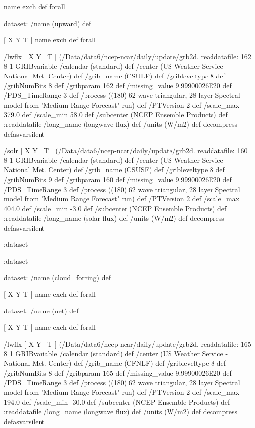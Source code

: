 \begin{ingrid}
   [ X Y T ] { name exch def } forall

   dataset: /name (upward) def

    [ X Y T ] { name exch def } forall

    /lwflx { [ X Y | T ] (/Data/data6/ncep-ncar/daily/update/grb2d.%
    readdatafile:
    162 8 1 GRIBvariable
    /calendar (standard) def
    /center (US Weather Service - National Met. Center) def
    /grib_name (CSULF) def
    /gribleveltype 8 def
    /gribNumBits 8 def
    /gribparam 162 def
    /missing_value 9.99900026E20 def
    /PDS_TimeRange 3 def
    /process ((180) 62 wave triangular, 28 layer Spectral model from "Medium Range Forecast" run) def
    /PTVersion 2 def
    /scale_max 379.0 def
    /scale_min 58.0 def
    /subcenter (NCEP Ensemble Products) def
    :readdatafile
    /long_name (longwave flux) def
    /units (W/m2) def
    decompress
    } defasvarsilent

    /solr { [ X Y | T ] (/Data/data6/ncep-ncar/daily/update/grb2d.%
    readdatafile:
    160 8 1 GRIBvariable
    /calendar (standard) def
    /center (US Weather Service - National Met. Center) def
    /grib_name (CSUSF) def
    /gribleveltype 8 def
    /gribNumBits 9 def
    /gribparam 160 def
    /missing_value 9.99900026E20 def
    /PDS_TimeRange 3 def
    /process ((180) 62 wave triangular, 28 layer Spectral model from "Medium Range Forecast" run) def
    /PTVersion 2 def
    /scale_max 404.0 def
    /scale_min -3.0 def
    /subcenter (NCEP Ensemble Products) def
    :readdatafile
    /long_name (solar flux) def
    /units (W/m2) def
    decompress
    } defasvarsilent

   :dataset

  :dataset

  dataset: /name (cloud_forcing) def

   [ X Y T ] { name exch def } forall

   dataset: /name (net) def

    [ X Y T ] { name exch def } forall

    /lwflx { [ X Y | T ] (/Data/data6/ncep-ncar/daily/update/grb2d.%
    readdatafile:
    165 8 1 GRIBvariable
    /calendar (standard) def
    /center (US Weather Service - National Met. Center) def
    /grib_name (CFNLF) def
    /gribleveltype 8 def
    /gribNumBits 8 def
    /gribparam 165 def
    /missing_value 9.99900026E20 def
    /PDS_TimeRange 3 def
    /process ((180) 62 wave triangular, 28 layer Spectral model from "Medium Range Forecast" run) def
    /PTVersion 2 def
    /scale_max 194.0 def
    /scale_min -30.0 def
    /subcenter (NCEP Ensemble Products) def
    :readdatafile
    /long_name (longwave flux) def
    /units (W/m2) def
    decompress
    } defasvarsilent


\end{ingrid}
